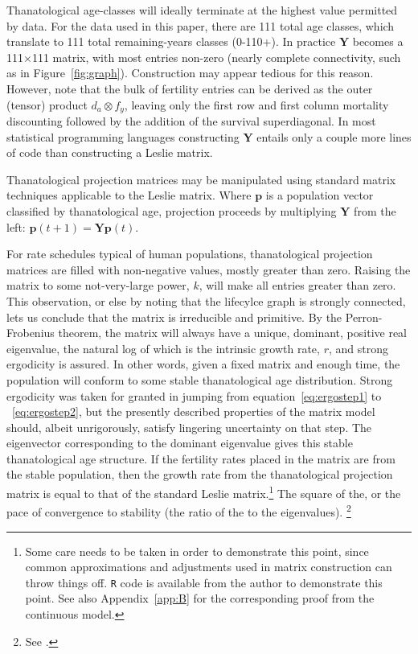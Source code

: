 \documentclass{article}
\begin{document}
Thanatological age-classes will ideally terminate at the highest value permitted
by data. For the data used in this paper, there are 111 total age classes, which
translate to 111 total remaining-years classes (0-110+). In practice $\textbf{Y}$ becomes
a 111$\times$111 matrix, with most entries non-zero (nearly complete
connectivity, such as in Figure~\ref{fig:graph}). Construction may appear tedious for
this reason. However, note that the bulk of fertility entries can be derived as the outer (tensor) product $d_a \otimes f_y$, leaving only the first row and first column mortality discounting followed by the addition of the
survival superdiagonal. In most statistical programming languages constructing $\textbf{Y}$ entails only
a couple more lines of code than constructing a Leslie matrix.

Thanatological projection matrices may be manipulated using
standard matrix techniques applicable to the Leslie matrix. Where $\textbf{p}$
is a population vector classified by thanatological age, projection proceeds by
multiplying $\textbf{Y}$ from the left:
$\textbf{p}(t + 1) = \textbf{Y}\textbf{p}(t)$. 

For rate schedules typical of human populations, thanatological projection
matrices are filled with non-negative values, mostly greater than zero. Raising
the matrix to some not-very-large power, $k$, will make all entries greater than zero. This observation, or else by noting that the
lifecylce graph is strongly connected, lets us conclude that the matrix is
irreducible and primitive. By the Perron-Frobenius theorem, the matrix will
 always have a unique, dominant, positive real eigenvalue, the natural
log of which is the intrinsic growth rate, $r$, and strong ergodicity is
assured.
In other words, given a fixed matrix and enough time, the population will conform to some stable thanatological age distribution. Strong
ergodicity was taken for granted in jumping from equation~\eqref{eq:ergostep1}
to ~\eqref{eq:ergostep2}, but the presently described properties of the matrix
model should, albeit unrigorously, satisfy lingering uncertainty on that step.
The eigenvector corresponding to the dominant eigenvalue gives this stable
thanatological age structure. If the fertility rates placed in the matrix are
from the stable population, then the growth rate from the thanatological
projection matrix is equal to that of the standard Leslie
matrix.\footnote{Some care needs to be taken in order to demonstrate this
point, since common approximations and adjustments used in matrix
construction can throw things off. \texttt{R} code is available from the
author to demonstrate this point. See also Appendix~\ref{app:B} for the
corresponding proof from the continuous model.} The square of the, or the pace
of convergence to stability (the ratio of the  to the  eigenvalues).
\footnote{See \citet[p.86-87]{caswell2001matrix}.}
\end{document}

